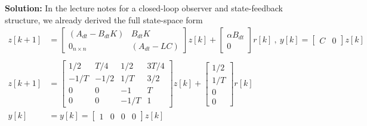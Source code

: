 \documentclass[twoside]{article}
\begin{document}
\begin{enumerate}
\textbf{Solution:} In the lecture notes for a closed-loop observer and state-feedback structure, we already derived the full state-space form
\begin{align*}
  z[k+1] &= \left[ \begin{array}{cc} (A_{dt} - B_{dt} K) & B_{dt} K\\ 0_{n \times n}
                                              & (A_{dt} - LC) \end{array}
                                                \right] z[k] + \left[ \begin{array}{c} \alpha B_{dt} \\ 0 \end{array} \right] r[k]
\ , \
 y[k] = \left[ \begin{array}{cc} C & 0  \end{array}
                                                \right] z[k]  
                                                \\ \\
  z[k+1] &= \left[ \begin{array}{cc|cc} 1/2 & T/4 & 1/2 & 3T/4 \\ -1/T & -1/2 & 1/T & 3/2 \\ \hline 0 & 0 & -1 & T \\ 0 & 0 & -1/T & 1 \end{array}
                                                \right] z[k] + \left[ \begin{array}{c} 1/2 \\ 1/T \\ \hline 0 \\ 0 \end{array} \right] r[k]  
                                                \\
                                                y[k] & = y[k] = \left[ \begin{array}{cc|cc} 1 & 0 & 0 & 0  \end{array}
                                                \right] z[k]                                              
\end{align*}
%



\end{enumerate}


\end{document}
